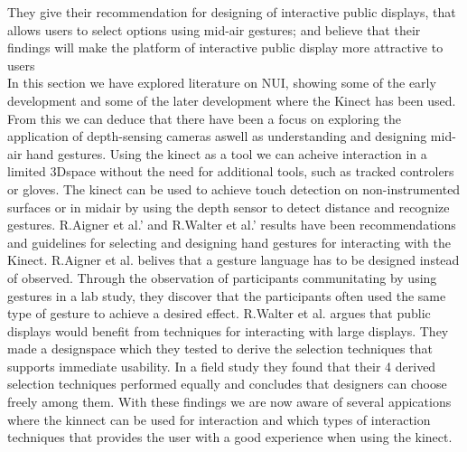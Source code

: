 They give their recommendation for designing of interactive public displays, that allows users to select options using mid-air gestures; and believe that their findings will make the platform of interactive public display more attractive to users
\\

In this section we have explored literature on NUI, showing some of the early development and some of the later development where the Kinect has been used. From this we can deduce that there have been a focus on exploring the application of depth-sensing cameras aswell as understanding and designing mid-air hand gestures.
Using the kinect as a tool we can acheive interaction in a limited 3Dspace without the need for additional tools, such as tracked controlers or gloves. The kinect can be used to achieve touch detection on non-instrumented surfaces or in midair by using the depth sensor to detect distance and recognize gestures.  R.Aigner et al.' and R.Walter et al.' results have been recommendations and guidelines for selecting and designing hand gestures for interacting with the Kinect. R.Aigner  et al. belives that a gesture language has to be designed instead of observed. Through the observation of participants communitating by using gestures in a lab study, they discover that the participants often used the same type of gesture to achieve a desired effect.
R.Walter et al. argues that public displays would benefit from techniques for interacting with large displays. They made a designspace which they tested to derive the selection techniques that supports immediate usability. In a field study they found that their 4 derived selection techniques performed equally and concludes that designers can choose freely among them.
With these findings we are now aware of several appications where the kinnect can be used for interaction and which types of interaction techniques that provides the user with a good experience when using the kinect.